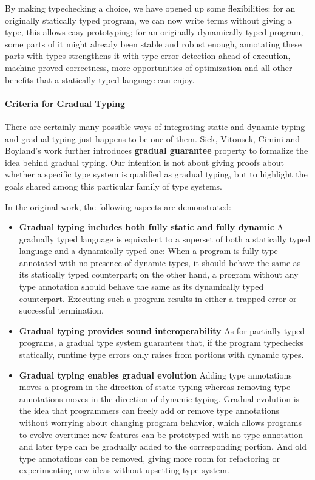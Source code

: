 By making typechecking a choice, we have opened up some flexibilities:
for an originally statically typed program, we can now write terms without giving a type,
this allows easy prototyping; for an originally dynamically typed program,
some parts of it might already been stable and robust enough, annotating these parts
with types strengthens it with type error detection ahead of execution, machine-proved correctness,
more opportunities of optimization and 
all other benefits that a statically typed language can enjoy.

\paragraph{Criteria for Gradual Typing}

There are certainly many possible ways of integrating static and dynamic typing
and gradual typing just happens to be one of them.
Siek, Vitousek, Cimini and Boyland's work \cite{siek2015refined}
further introduces \textbf{gradual guarantee} property
to formalize the idea behind gradual typing.
Our intention is not about giving proofs about whether a specific type system is qualified as
gradual typing, but to highlight the goals shared among this particular family of type systems.

In the original work, the following aspects are demonstrated:

\begin{itemize}
	\item \textbf{Gradual typing includes both fully static and fully dynamic}
	A gradually typed language is equivalent to a superset of both a statically typed
	language and a dynamically typed one:
	When a program is fully type-annotated with no presence of dynamic types,
	it should behave the same as its statically typed counterpart;
	on the other hand, a program without any type annotation should behave the same
	as its dynamically typed counterpart. Executing such a program
	results in either a trapped error \cite{luca1997} or successful termination.
	\item \textbf{Gradual typing provides sound interoperability}
	As for partially typed programs, a gradual type system guarantees that,
	if the program typechecks statically, runtime type errors only raises from
	portions with dynamic types.
	\item \textbf{Gradual typing enables gradual evolution}
	Adding type annotations moves a program in the direction of static typing
	whereas removing type annotations moves in the direction of dynamic typing.
	Gradual evolution is the idea that programmers can freely add or remove type annotations
	without worrying about changing program behavior, which allows programs to evolve overtime:
	new features can be prototyped with no type annotation and later type can be gradually
	added to the corresponding portion. And old type annotations can be removed,
	giving more room for refactoring or experimenting new ideas without upsetting type system.
\end{itemize}

